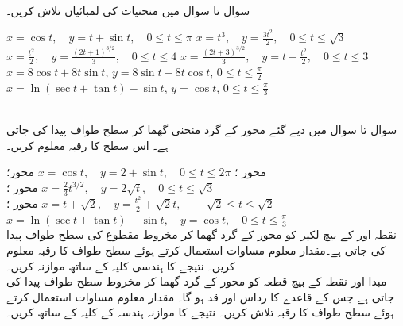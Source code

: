 \\
سوال  تا سوال  میں منحنیات کی لمبائیاں تلاش کریں۔

$x=\cos t,\quad y=t+\sin t,\quad 0\le t\le \pi$
$x=t^3,\quad y=\frac{3t^2}{2},\quad 0\le t\le \sqrt{3}$
$x=\frac{t^2}{2},\quad y=\frac{(2t+1)^{3/2}}{3},\quad 0\le t\le 4$
$x=\frac{(2t+3)^{3/2}}{3},\quad y=t+\frac{t^2}{2},\quad 0\le t\le 3$
$x=8\cos t+8t\sin t,\, y=8\sin t-8t\cos t,\, 0\le t\le \frac{\pi}{2}$
$x=\ln(\sec t+\tan t)-\sin t,\, y=\cos t,\, 0\le t\le \frac{\pi}{3}$

\\
سوال  تا سوال  میں دیے گئے محور کے گرد منحنی گھما کر سطح طواف پیدا کی جاتی ہے۔ اس سطح کا رقبہ معلوم کریں۔

محور ؛ \quad
$x=\cos t,\quad y=2+\sin t,\quad 0\le t\le 2\pi$
محور؛ \quad
$x=\frac{2}{3}t^{3/2},\quad y=2\sqrt{t},\quad 0\le t\le \sqrt{3}$
محور ؛ \quad
$x=t+\sqrt{2},\quad y=\frac{t^2}{2}+\sqrt{2}t,\quad -\sqrt{2}\le t\le \sqrt{2}$
محور ؛ \quad
$x=\ln(\sec t+\tan t)-\sin t,\quad y=\cos t,\quad 0\le t\le \frac{\pi}{3}$
\\
نقطہ  اور  کے بیچ لکیر کو محور  کے گرد گھما کر مخروط مقطوع کی  سطح طواف پیدا کی جاتی ہے۔مقدار معلوم مساوات  استعمال کرتے ہوئے سطح طواف کا رقبہ معلوم کریں۔ نتیجے کا  ہندسی  کلیہ  کے ساتھ موازنہ کریں۔
\\
مبدا اور نقطہ  کے بیچ قطعہ کو محور  کے گرد گھما کر مخروط سطح طواف پیدا کی جاتی ہے جس کے قاعدے کا رداس  اور  قد  ہو گا۔ مقدار معلوم مساوات  استعمال کرتے ہوئے سطح طواف کا رقبہ تلاش کریں۔  نتیجے کا موازنہ ہندسہ کے کلیہ  کے ساتھ کریں۔

